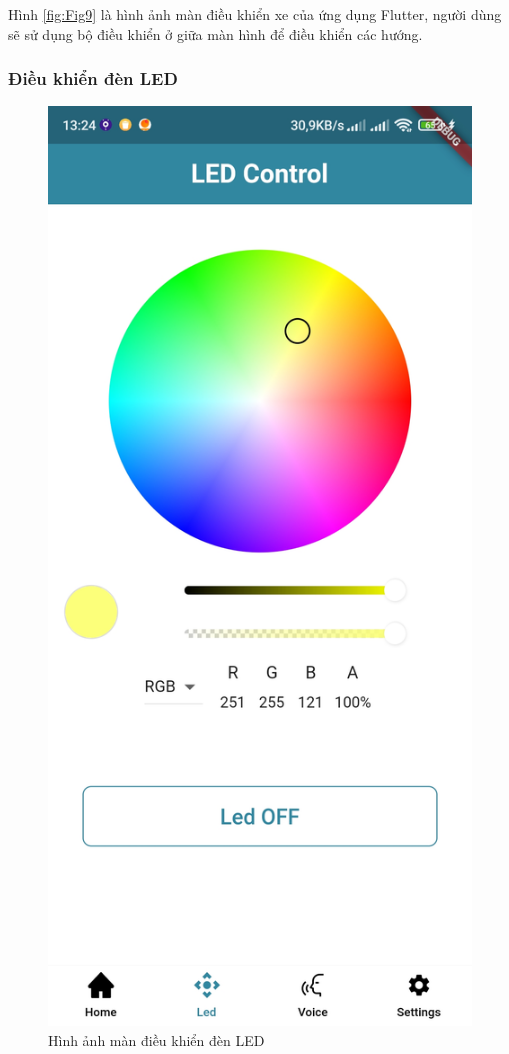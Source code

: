 \documentclass[../DoAn.tex]{subfiles}
\begin{document}
Hình \ref{fig:Fig9} là hình ảnh màn điều khiển xe của ứng dụng Flutter, người dùng sẽ sử dụng bộ điều khiển ở giữa màn hình để điều khiển các hướng.

\subsubsection{Điều khiển đèn LED}

\begin{figure}[H]
    \centering
    \includegraphics[scale = 0.2]{Hinhve/app_2.jpg}
    \caption{Hình ảnh màn điều khiển đèn LED}
    \label{fig:Fig10}
\end{figure}
\end{document}
